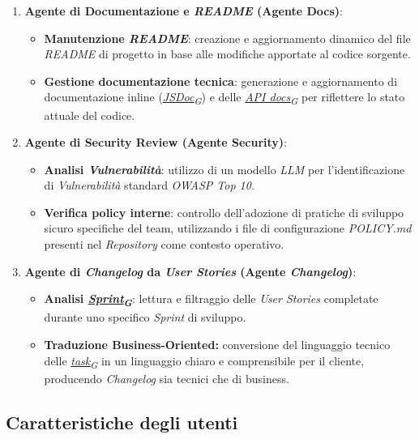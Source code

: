 \documentclass[12pt, a4paper]{article}
\newcommand{\urlglossario}{https://skynetunigroup.github.io/Code_Guardian/Documentazione/PB/glossario_v2.0.0.pdf} %
\newcommand{\glo}[2]{\href{\urlglossario\#nameddest=#2}{#1\textsubscript{G}}}
\begin{document}
\begin{enumerate}
\def\labelenumi{\arabic{enumi}.}
\item
  \textbf{Agente di Documentazione e \textit{README} (Agente Docs)}:

  \begin{itemize}
  \item
    \textbf{Manutenzione \textit{README}}: creazione e aggiornamento dinamico del
    file \textit{README} di progetto in base alle modifiche apportate al codice sorgente.
\item
    \textbf{Gestione documentazione tecnica}: generazione e
    aggiornamento di documentazione inline (\textit{\glo{JSDoc}{jsdoc}}) e delle \textit{\glo{API docs}{api-docs}} per riflettere lo stato
    attuale del codice.
\end{itemize}
\item
  \textbf{Agente di Security Review (Agente Security)}:

  \begin{itemize}
  \item
    \textbf{Analisi \textit{Vulnerabilità}}: utilizzo di un modello \textit{LLM} per l'identificazione di \textit{Vulnerabilità}
    standard \textit{OWASP Top 10}.
\item
    \textbf{Verifica policy interne}: controllo
    dell'adozione di pratiche di sviluppo sicuro
    specifiche del team, utilizzando i file di configurazione
    \emph{POLICY.md} presenti nel \textit{Repository} come contesto operativo.
\end{itemize}
\item
  \textbf{Agente di \textit{Changelog} da \textit{User Stories} (Agente \textit{Changelog})}:

  \begin{itemize}
  \item
    \textbf{Analisi \textit{\glo{Sprint}{sprint}}}: lettura e filtraggio delle \textit{User
    Stories} completate durante uno specifico \textit{Sprint} di sviluppo.
\item
    \textbf{Traduzione Business-Oriented:} conversione del linguaggio
    tecnico delle \textit{\glo{task}{task}} in un linguaggio chiaro e comprensibile per il
    cliente, producendo \textit{Changelog} sia tecnici che di business.
\end{itemize}
\end{enumerate}

\subsection{Caratteristiche degli utenti}
\end{document}
